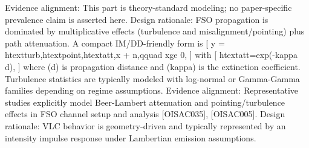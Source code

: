 {}Evidence alignment: This part is theory-standard modeling; no paper-specific prevalence claim is asserted here.\markdownRendererInterblockSeparator
{}
\markdownRendererSectionEnd \markdownRendererSectionBegin
{}\markdownRendererInterblockSeparator
{}Design rationale: FSO propagation is dominated by multiplicative effects (turbulence and misalignment/pointing) plus path attenuation.\markdownRendererParagraphSeparator
{}A compact IM/DD-friendly form is\markdownRendererSoftLineBreak
{}[\markdownRendererSoftLineBreak
{}y = h\markdownRendererUnderscore{}\markdownRendererLeftBrace{}\markdownRendererBackslash{}text\markdownRendererLeftBrace{}turb\markdownRendererRightBrace{}\markdownRendererRightBrace{},h\markdownRendererUnderscore{}\markdownRendererLeftBrace{}\markdownRendererBackslash{}text\markdownRendererLeftBrace{}point\markdownRendererRightBrace{}\markdownRendererRightBrace{},h\markdownRendererUnderscore{}\markdownRendererLeftBrace{}\markdownRendererBackslash{}text\markdownRendererLeftBrace{}att\markdownRendererRightBrace{}\markdownRendererRightBrace{},x + n,\markdownRendererBackslash{}qquad x\markdownRendererBackslash{}ge 0,\markdownRendererSoftLineBreak
{}]\markdownRendererSoftLineBreak
{}with\markdownRendererSoftLineBreak
{}[\markdownRendererSoftLineBreak
{}h\markdownRendererUnderscore{}\markdownRendererLeftBrace{}\markdownRendererBackslash{}text\markdownRendererLeftBrace{}att\markdownRendererRightBrace{}\markdownRendererRightBrace{}=\markdownRendererBackslash{}exp(-\markdownRendererBackslash{}kappa d),\markdownRendererSoftLineBreak
{}]\markdownRendererSoftLineBreak
{}where (d) is propagation distance and (\markdownRendererBackslash{}kappa) is the extinction coefficient. Turbulence statistics are typically modeled with log-normal or Gamma-Gamma families depending on regime assumptions.\markdownRendererParagraphSeparator
{}Evidence alignment: Representative studies explicitly model Beer-Lambert attenuation and pointing/turbulence effects in FSO channel setup and analysis [O\markdownRendererUnderscore{}ISAC\markdownRendererUnderscore{}035], [O\markdownRendererUnderscore{}ISAC\markdownRendererUnderscore{}005].\markdownRendererInterblockSeparator
{}
\markdownRendererSectionEnd \markdownRendererSectionBegin
{}\markdownRendererInterblockSeparator
{}Design rationale: VLC behavior is geometry-driven and typically represented by an intensity impulse response under Lambertian emission assumptions.\markdownRendererParagraphSeparator
